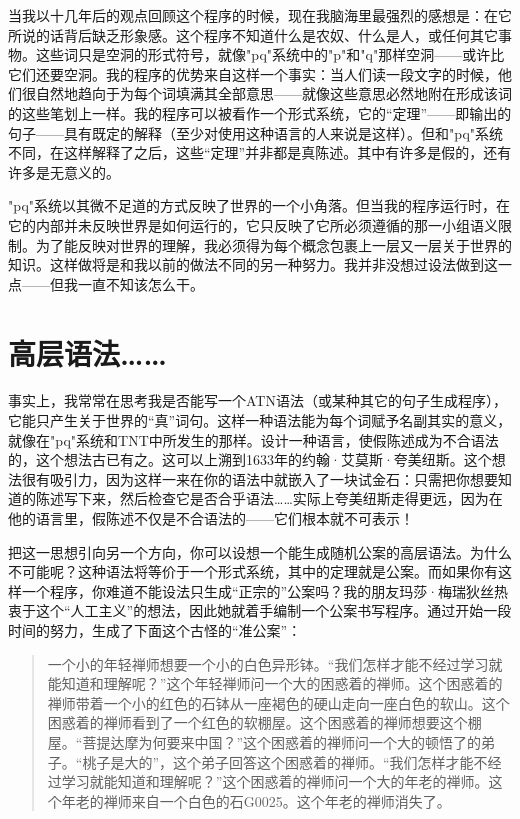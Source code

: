 当我以十几年后的观点回顾这个程序的时候，现在我脑海里最强烈的感想是：在它所说的话背后缺乏形象感。这个程序不知道什么是农奴、什么是人，或任何其它事物。这些词只是空洞的形式符号，就像"pq"系统中的"p"和"q"那样空洞——或许比它们还要空洞。我的程序的优势来自这样一个事实：当人们读一段文字的时候，他们很自然地趋向于为每个词填满其全部意思——就像这些意思必然地附在形成该词的这些笔划上一样。我的程序可以被看作一个形式系统，它的“定理”——即输出的句子——具有既定的解释（至少对使用这种语言的人来说是这样）。但和"pq"系统不同，在这样解释了之后，这些“定理”并非都是真陈述。其中有许多是假的，还有许多是无意义的。

"pq"系统以其微不足道的方式反映了世界的一个小角落。但当我的程序运行时，在它的内部并未反映世界是如何运行的，它只反映了它所必须遵循的那一小组语义限制。为了能反映对世界的理解，我必须得为每个概念包裹上一层又一层关于世界的知识。这样做将是和我以前的做法不同的另一种努力。我并非没想过设法做到这一点——但我一直不知该怎么干。

\section{高层语法……}

事实上，我常常在思考我是否能写一个ATN语法（或某种其它的句子生成程序），它能只产生关于世界的“真”词句。这样一种语法能为每个词赋予名副其实的意义，就像在"pq"系统和TNT中所发生的那样。设计一种语言，使假陈述成为不合语法的，这个想法古已有之。这可以上溯到1633年的约翰·艾莫斯·夸美纽斯。这个想法很有吸引力，因为这样一来在你的语法中就嵌入了一块试金石：只需把你想要知道的陈述写下来，然后检查它是否合乎语法……实际上夸美纽斯走得更远，因为在他的语言里，假陈述不仅是不合语法的——它们根本就不可表示！

把这一思想引向另一个方向，你可以设想一个能生成随机公案的高层语法。为什么不可能呢？这种语法将等价于一个形式系统，其中的定理就是公案。而如果你有这样一个程序，你难道不能设法只生成“正宗的”公案吗？我的朋友玛莎·梅瑞狄丝热衷于这个“人工主义”的想法，因此她就着手编制一个公案书写程序。通过开始一段时间的努力，生成了下面这个古怪的“准公案”：

\begin{quote}
一个小的年轻禅师想要一个小的白色异形钵。“我们怎样才能不经过学习就能知道和理解呢？”这个年轻禅师问一个大的困惑着的禅师。这个困惑着的禅师带着一个小的红色的石钵从一座褐色的硬山走向一座白色的软山。这个困惑着的禅师看到了一个红色的软棚屋。这个困惑着的禅师想要这个棚屋。“菩提达摩为何要来中国？”这个困惑着的禅师问一个大的顿悟了的弟子。“桃子是大的”，这个弟子回答这个困惑着的禅师。“我们怎样才能不经过学习就能知道和理解呢？”这个困惑着的禅师问一个大的年老的禅师。这个年老的禅师来自一个白色的石G0025。这个年老的禅师消失了。
\end{quote}

